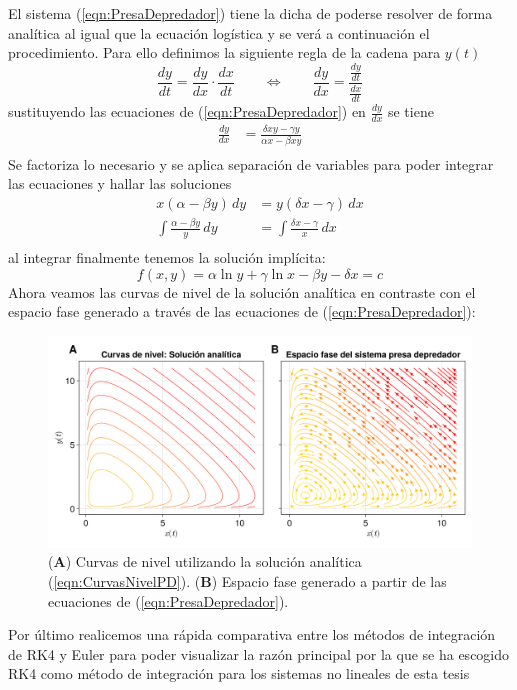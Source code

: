El sistema (\ref{eqn:PresaDepredador}) tiene la dicha de poderse resolver de forma analítica al igual que la ecuación logística y se verá a continuación el procedimiento. Para ello definimos la siguiente regla de la cadena para $y(t)$
$$\frac{dy}{dt} = \frac{dy}{dx}\cdot\frac{dx}{dt}\qquad\Longleftrightarrow\qquad\frac{dy}{dx}=\frac{\frac{dy}{dt}}{\frac{dx}{dt}}$$
sustituyendo las ecuaciones de (\ref{eqn:PresaDepredador}) en $\frac{dy}{dx}$ se tiene
\begin{align*}
	\frac{dy}{dx}&=\frac{\delta xy-\gamma y}{\alpha x-\beta xy}  \\
\end{align*}
Se factoriza lo necesario y se aplica separación de variables para poder integrar las ecuaciones y hallar las soluciones
\begin{align*}
	x(\alpha-\beta y)\, dy &= y(\delta x-\gamma)\, dx\\
	\int \frac{\alpha-\beta y}{y}\, dy &= \int \frac{\delta x-\gamma}{x}\, dx \\
\end{align*}
al integrar finalmente tenemos la solución implícita:
\begin{equation}\label{eqn:CurvasNivelPD}
	f(x,y)=\alpha\ln y+\gamma\ln x-\beta y- \delta x=c
\end{equation}
Ahora veamos las curvas de nivel de la solución analítica en contraste con el espacio fase generado a través de las ecuaciones de (\ref{eqn:PresaDepredador}):
\begin{figure}[h!]
	\centering
	\includegraphics[scale=0.22]{../../Imagenes/Curvas de nivel PD}
	\caption{(\textbf{A}) Curvas de nivel utilizando la solución analítica (\ref{eqn:CurvasNivelPD}). (\textbf{B}) Espacio fase generado a partir de las ecuaciones de (\ref{eqn:PresaDepredador}).}
	\label{fig:CurvasNivelPD}
\end{figure}
\newpage
Por último realicemos una rápida comparativa entre los métodos de integración de RK4 y Euler para poder visualizar la razón principal por la que se ha escogido RK4 como método de integración para los sistemas no lineales de esta tesis
